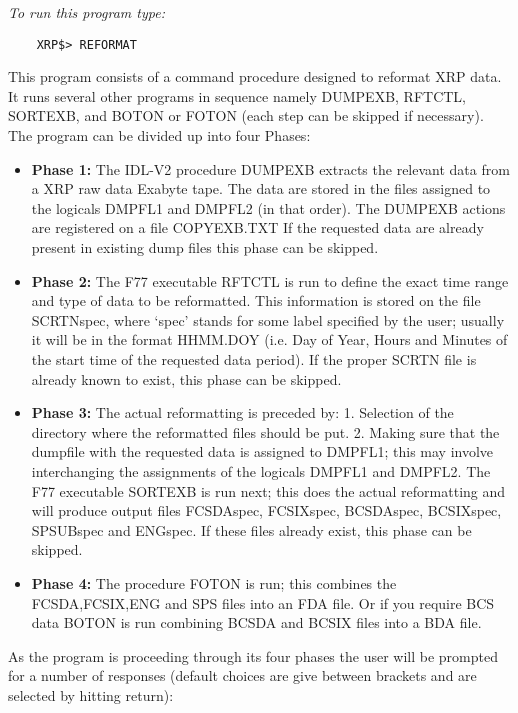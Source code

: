 {\em To run this program type:}
\begin{verbatim}
    XRP$> REFORMAT                  
\end{verbatim}
 This program consists of a command procedure designed to reformat XRP data.
 It runs several other programs in sequence namely DUMPEXB, RFTCTL, SORTEXB,
 and BOTON or FOTON (each step can be skipped if necessary). 
 The program can be divided up into four Phases:
\begin{itemize}
\item	{\bf Phase 1: }
	The IDL-V2 procedure DUMPEXB extracts the relevant data from a XRP raw data Exabyte tape.	
	The data are stored in the files assigned to the logicals DMPFL1 and DMPFL2 (in that order).
	The DUMPEXB actions are registered on a file COPYEXB.TXT
	If the requested data are already present in existing dump files this phase can be skipped.
\item	{\bf Phase 2: }
	The F77 executable RFTCTL is run to define the exact time range and type of data to be 
	reformatted. This information is stored on the file SCRTNspec, where `spec' stands for some 
	label specified by the user; usually it will be in the format HHMM.DOY (i.e. Day of Year, Hours 
	and Minutes of the start time of the requested data period).
	If the proper SCRTN file is already known to exist, this phase can be skipped.
\item	{\bf Phase 3: }
	The actual reformatting is preceded by:
	1. Selection of the directory where the reformatted files should be put.
	2. Making sure that the dumpfile with the requested data is assigned to DMPFL1; this may involve 
	   interchanging the assignments of the logicals DMPFL1 and DMPFL2.
	The F77 executable SORTEXB is run next; this does the actual reformatting and will produce output
	files FCSDAspec, FCSIXspec, BCSDAspec, BCSIXspec, SPSUBspec and ENGspec.
	If these files already exist, this phase can be skipped.
\item	{\bf Phase 4: }
	The procedure FOTON is run; this combines the FCSDA,FCSIX,ENG 
        and SPS files into an FDA file. Or if you require BCS data 
        BOTON is run combining BCSDA and BCSIX files into a BDA file.
\end{itemize}
        As the program is proceeding through its four phases the 
	user will be prompted for a number of responses (default choices are give between brackets and 
	are selected by hitting return):
